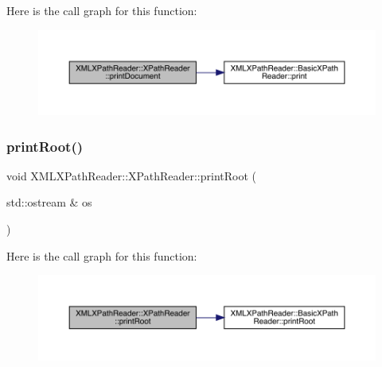 Here is the call graph for this function\+:
\nopagebreak
\begin{figure}[H]
\begin{center}
\leavevmode
\includegraphics[width=350pt]{d3/d5a/classXMLXPathReader_1_1XPathReader_a5505bd1ad902828907e2562947719fef_cgraph}
\end{center}
\end{figure}
\mbox{\label{classXMLXPathReader_1_1XPathReader_a9634a8955fc1b2c8bc086b95f7fa2c1f}} 
\subsubsection{\texorpdfstring{printRoot()}{printRoot()}\hspace{0.1cm}{\footnotesize\ttfamily [1/2]}}
{\footnotesize\ttfamily void X\+M\+L\+X\+Path\+Reader\+::\+X\+Path\+Reader\+::print\+Root (\begin{DoxyParamCaption}\item[{std\+::ostream \&}]{os }\end{DoxyParamCaption})\hspace{0.3cm}{\ttfamily [inline]}}

Here is the call graph for this function\+:
\nopagebreak
\begin{figure}[H]
\begin{center}
\leavevmode
\includegraphics[width=350pt]{d3/d5a/classXMLXPathReader_1_1XPathReader_a9634a8955fc1b2c8bc086b95f7fa2c1f_cgraph}
\end{center}
\end{figure}
\mbox{\label{classXMLXPathReader_1_1XPathReader_a9634a8955fc1b2c8bc086b95f7fa2c1f}} 
